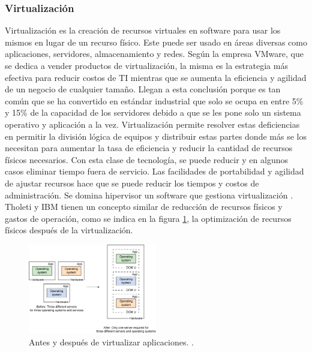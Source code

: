 \subsubsection{Virtualización}
Virtualización es la creación de recursos virtuales en software para usar los mismos en lugar de un recurso físico. Este puede ser usado en áreas diversas como aplicaciones, servidores, almacenamiento y redes. Según la empresa VMware, que se dedica a vender productos de virtualización, la misma es la estrategia más efectiva para reducir costos de TI mientras que se aumenta la eficiencia y agilidad de un negocio de cualquier tamaño. Llegan a esta conclusión porque es tan común que se ha convertido en estándar industrial que solo se ocupa en entre 5\% y 15\% de la capacidad de los servidores debido a que se les pone solo un sistema operativo y aplicación a la vez. Virtualización permite resolver estas deficiencias en permitir la división lógica de equipos y distribuir estas partes donde más se los necesitan para aumentar la tasa de eficiencia y reducir la cantidad de recursos físicos necesarios. Con esta clase de tecnología, se puede reducir y en algunos casos eliminar tiempo fuera de servicio. Las facilidades de portabilidad y agilidad de ajustar recursos hace que se puede reducir los tiempos y costos de administración. Se domina hipervisor un software que gestiona virtualización \citep{VMWare-Virtualization}. Tholeti y IBM tienen un concepto similar de reducción de recursos físicos y gastos de operación, como se indica en la figura \ref{IBM-Virtualization}, la optimización de recursos físicos después de la virtualización.

\begin{figure}
  \begin{center}
      \includegraphics[width=0.5\textwidth]{Figures/ibm-virtualization.png}
  \end{center}
  \caption{Antes y después de virtualizar aplicaciones. \citep{IBM-Hypervisors}.}
  \label{IBM-Virtualization}
\end{figure}

